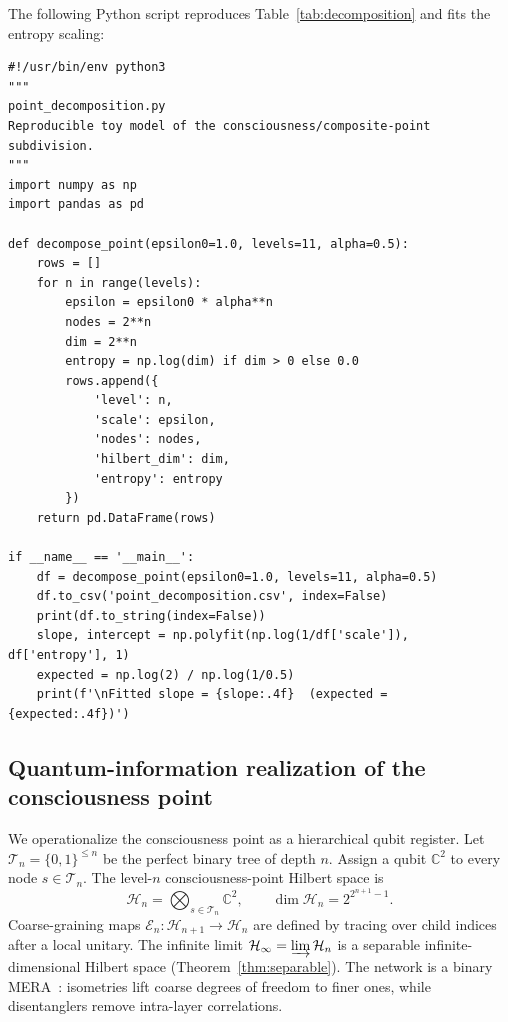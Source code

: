 \documentclass[11pt,a4paper]{article}
\theoremstyle{plain}
\begin{document}
The following Python script reproduces Table~\ref{tab:decomposition} and fits the entropy scaling:

\begin{lstlisting}[title={point\_decomposition.py}]
#!/usr/bin/env python3
"""
point_decomposition.py
Reproducible toy model of the consciousness/composite-point subdivision.
"""
import numpy as np
import pandas as pd

def decompose_point(epsilon0=1.0, levels=11, alpha=0.5):
    rows = []
    for n in range(levels):
        epsilon = epsilon0 * alpha**n
        nodes = 2**n
        dim = 2**n
        entropy = np.log(dim) if dim > 0 else 0.0
        rows.append({
            'level': n,
            'scale': epsilon,
            'nodes': nodes,
            'hilbert_dim': dim,
            'entropy': entropy
        })
    return pd.DataFrame(rows)

if __name__ == '__main__':
    df = decompose_point(epsilon0=1.0, levels=11, alpha=0.5)
    df.to_csv('point_decomposition.csv', index=False)
    print(df.to_string(index=False))
    slope, intercept = np.polyfit(np.log(1/df['scale']), df['entropy'], 1)
    expected = np.log(2) / np.log(1/0.5)
    print(f'\nFitted slope = {slope:.4f}  (expected = {expected:.4f})')
\end{lstlisting}

\subsection{Quantum-information realization of the consciousness point}

We operationalize the consciousness point as a hierarchical qubit register. Let $\mathcal{T}_n=\{0,1\}^{\le n}$ be the perfect binary tree of depth $n$. Assign a qubit $\mathbb{C}^2$ to every node $s\in\mathcal{T}_n$. The level-$n$ consciousness-point Hilbert space is
\begin{equation}\label{eq:qnspace}
\mathcal{H}_n=\bigotimes_{s\in\mathcal{T}_n}\mathbb{C}^2,\qquad \dim\mathcal{H}_n=2^{2^{n+1}-1}.
\end{equation}
Coarse-graining maps $\mathcal{E}_n:\mathcal{H}_{n+1}\to\mathcal{H}_n$ are defined by tracing over child indices after a local unitary. The infinite limit $\mathcal{H}_\infty=\varinjlim\mathcal{H}_n$ is a separable infinite-dimensional Hilbert space (Theorem~\ref{thm:separable}). The network is a binary MERA~\cite{vidal2007,evenbly2015}: isometries lift coarse degrees of freedom to finer ones, while disentanglers remove intra-layer correlations.
\end{document}
